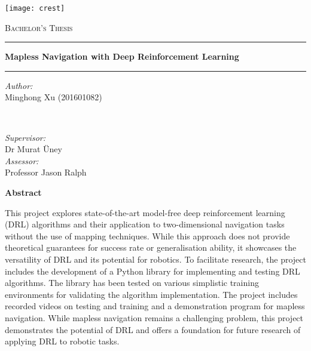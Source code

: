 \begin{titlepage}
\center %

\texttt{[image: crest]}

\vspace{6mm}

\textsc{\Large Bachelor's Thesis}

\vspace{6mm}

\rule[6mm]{\linewidth}{0.75mm}
{\Large\bfseries
Mapless Navigation with Deep Reinforcement Learning
}\rule[-3mm]{\linewidth}{0.75mm}

\vspace{5mm}

\begin{minipage}{0.4\textwidth}
   \begin{flushleft}
      \emph{Author:} \\
      Minghong Xu (201601082)
   \end{flushleft}
\end{minipage}
~
\begin{minipage}{0.4\textwidth}
   \begin{flushright}
      \emph{Supervisor:} \\
      Dr Murat {\"U}ney
      \\[1.2em]
      \emph{Assessor:} \\
      Professor Jason Ralph
   \end{flushright}
\end{minipage}

\vspace{3mm}

\textbf{Abstract}
\begin{spacing}{0.95}
\parbox{0.83\textwidth}{
This project explores state-of-the-art model-free deep reinforcement learning (DRL) algorithms and their application to two-dimensional navigation tasks without the use of mapping techniques. While this approach does not provide theoretical guarantees for success rate or generalisation ability, it showcases the versatility of DRL and its potential for robotics. To facilitate research, the project includes the development of a Python library for implementing and testing DRL algorithms. The library has been tested on various simplistic training environments for validating the algorithm implementation. The project includes recorded videos on testing and training and a demonstration program for mapless navigation. While mapless navigation remains a challenging problem, this project demonstrates the potential of DRL and offers a foundation for future research of applying DRL to robotic tasks.
}
\end{spacing}


\end{titlepage}
